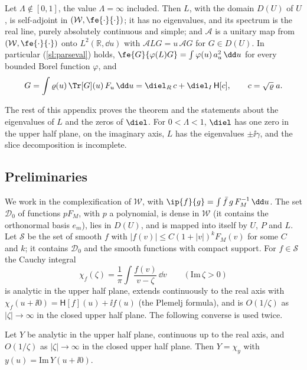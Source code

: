 \begin{theorem}\label{thm:spectrum}
Let $\Lambda\notin[0,1]$, the value $\Lambda=\infty$ included. Then $L$, with the domain $D(U)$ of $U$, is self-adjoint in $(\mathcal W,\fe{\cdot}{\cdot})$; it has no eigenvalues, and its spectrum is the real line, purely absolutely continuous and simple; and $\mathcal A$ is a unitary map from $(\mathcal W,\fe{\cdot}{\cdot})$ onto $L^2(\mathbb R,\dd u)$ with $\mathcal ALG=u\,\mathcal AG$ for $G\in D(U)$. In particular (\ref{sl:parseval}) holds, $\fe{G}{\varphi(L)G}=\int\varphi(u)\,a_u^2\,\dd u$ for every bounded Borel function $\varphi$, and
\begin{equation}\label{sl:inverse}
  G=\int\varrho(u)\,\Tr[G](u)\,F_u\,\dd u=\diel_R\,c+\diel_I\,\mathsf H[c],\qquad c=\sqrt\varrho\;a .
\end{equation}
\end{theorem}

The rest of this appendix proves the theorem and the statements about the eigenvalues of $L$ and the zeros of $\diel$. For $0<\Lambda<1$, $\diel$ has one zero in the upper half plane, on the imaginary axis, $L$ has the eigenvalues $\pm\ii\gamma$, and the slice decomposition is incomplete.

\subsection{Preliminaries}\label{appB:prelim}

We work in the complexification of $\mathcal W$, with $\ip{f}{g}=\int\bar f\,g\,F_M^{-1}\,\dd u$. The set $\mathcal D_0$ of functions $pF_M$, with $p$ a polynomial, is dense in $\mathcal W$ (it contains the orthonormal basis $e_m$), lies in $D(U)$, and is mapped into itself by $U$, $P$ and $L$. Let $\mathcal S$ be the set of smooth $f$ with $|f(v)|\le C(1+|v|)^kF_M(v)$ for some $C$ and $k$; it contains $\mathcal D_0$ and the smooth functions with compact support. For $f\in\mathcal S$ the Cauchy integral
\begin{equation*}
  \chi_f(\zeta)=\frac{1}{\pi}\int\frac{f(v)}{v-\zeta}\,\dd v\qquad(\mathrm{Im}\,\zeta>0)
\end{equation*}
is analytic in the upper half plane, extends continuously to the real axis with $\chi_f(u+\ii0)=\mathsf H[f](u)+\ii f(u)$ (the Plemelj formula), and is $O(1/\zeta)$ as $|\zeta|\to\infty$ in the closed upper half plane. The following converse is used twice.

\begin{lemma}\label{appB:lemma}
Let $Y$ be analytic in the upper half plane, continuous up to the real axis, and $O(1/\zeta)$ as $|\zeta|\to\infty$ in the closed upper half plane. Then $Y=\chi_y$ with $y(u)=\mathrm{Im}\,Y(u+\ii0)$.
\end{lemma}

